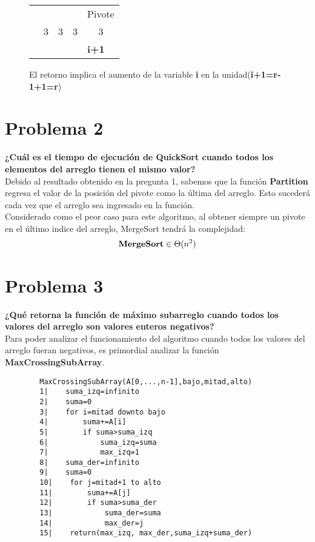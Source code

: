     \begin{figure}[h!]
        \centering
        \begin{tabular}{p{1cm}p{1cm}p{1cm}p{1cm}p{1cm}}
            & & & & {\small Pivote} \\\cline{2-5}
            & \multicolumn{1}{|c|}{3} & \multicolumn{1}{c|}{3} & \multicolumn{1}{c|}{3} & \multicolumn{1}{c|}{3} \\ \cline{2-5}
            & & & & \textbf{i+1} \\
        \end{tabular}
        \caption{El retorno implica el aumento de la variable \textbf{i} en la unidad(\textbf{i+1=r-1+1=r})}
        \label{fig:my_label}
    \end{figure}

\section*{Problema 2}
    \textbf{¿Cuál es el tiempo de ejecución de QuickSort cuando todos los elementos del arreglo tienen el mismo valor?}\\
    
    Debido al resultado obtenido en la pregunta 1, sabemos que la función \textbf{Partition} regresa el valor de la posición del pivote como la última del arreglo. Esto sucederá cada vez que el arreglo sea ingresado en la función.\\
    
    Considerado como el peor caso para este algoritmo, al obtener siempre un pivote en el último indice del arreglo, MergeSort tendrá la complejidad:
    \begin{equation*}
        \text{\textbf{MergeSort}}\in \Theta(n^2)
    \end{equation*}

\section*{Problema 3}
    \textbf{¿Qué retorna la función de máximo subarreglo cuando todos los valores del arreglo son valores enteros negativos?}\\
    
    Para poder analizar el funcionamiento del algoritmo cuando todos los valores del arreglo fueran negativos, es primordial analizar la función \textbf{MaxCrossingSubArray}.\\
    \begin{verbatim}
        MaxCrossingSubArray(A[0,...,n-1],bajo,mitad,alto)
        1|    suma_izq=infinito
        2|    suma=0
        3|    for i=mitad downto bajo
        4|        suma+=A[i]
        5|        if suma>suma_izq
        6|            suma_izq=suma
        7|            max_izq=1
        8|    suma_der=infinito
        9|    suma=0
        10|    for j=mitad+1 to alto
        11|        suma+=A[j]
        12|        if suma>suma_der
        13|            suma_der=suma
        14|            max_der=j
        15|    return(max_izq, max_der,suma_izq+suma_der)
    \end{verbatim}
    
